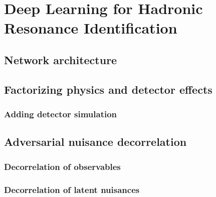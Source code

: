 \chapter{Deep Learning for Hadronic Resonance Identification}

\section{Network architecture}

\section{Factorizing physics and detector effects}

\subsection{Adding detector simulation}

\section{Adversarial nuisance decorrelation}

\subsection{Decorrelation of observables}

\subsection{Decorrelation of latent nuisances}
